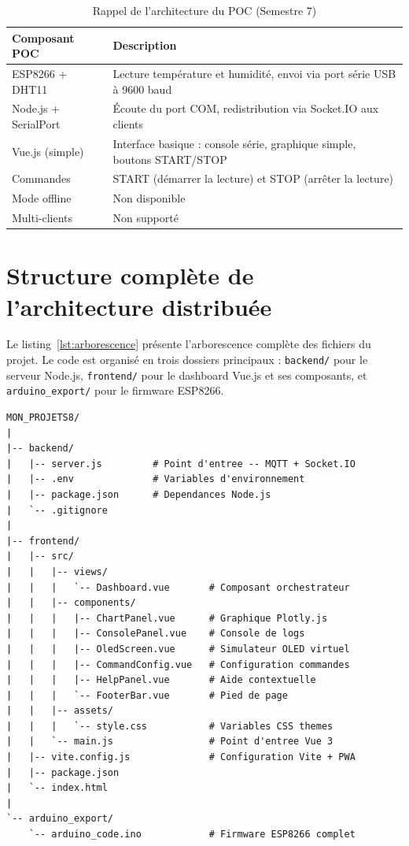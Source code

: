 \documentclass[12pt, a4paper]{report}
\begin{document}
\begin{table}[H]
\centering
\renewcommand{\arraystretch}{1.4}
\begin{tabularx}{\linewidth}{|l|X|}
\hline
\rowcolor{bleuFonce!10}
\textbf{Composant POC} & \textbf{Description} \\
\hline
ESP8266 + DHT11 &
  Lecture temp\'erature et humidit\'e, envoi via port s\'erie USB
  \`a 9600 baud \\
\hline
Node.js + SerialPort &
  \'Ecoute du port COM, redistribution via Socket.IO aux clients \\
\hline
Vue.js (simple) &
  Interface basique : console s\'erie, graphique simple, boutons
  START/STOP \\
\hline
Commandes &
  START (d\'emarrer la lecture) et STOP (arr\^eter la lecture) \\
\hline
Mode offline & Non disponible \\
\hline
Multi-clients & Non support\'e \\
\hline
\end{tabularx}
\caption{Rappel de l'architecture du POC (Semestre 7)}
\label{tab:poc}
\end{table}

\chapter{Structure compl\`ete de l'architecture distribu\'ee}

Le listing~\ref{lst:arborescence} pr\'esente l'arborescence compl\`ete
des fichiers du projet. Le code est organis\'e en trois dossiers
principaux : \texttt{backend/} pour le serveur Node.js,
\texttt{frontend/} pour le dashboard Vue.js et ses composants, et
\texttt{arduino\_export/} pour le firmware ESP8266.

\begin{lstlisting}[caption={Arborescence des fichiers du projet final},
                  label={lst:arborescence}]
MON_PROJETS8/
|
|-- backend/
|   |-- server.js         # Point d'entree -- MQTT + Socket.IO
|   |-- .env              # Variables d'environnement
|   |-- package.json      # Dependances Node.js
|   `-- .gitignore
|
|-- frontend/
|   |-- src/
|   |   |-- views/
|   |   |   `-- Dashboard.vue       # Composant orchestrateur
|   |   |-- components/
|   |   |   |-- ChartPanel.vue      # Graphique Plotly.js
|   |   |   |-- ConsolePanel.vue    # Console de logs
|   |   |   |-- OledScreen.vue      # Simulateur OLED virtuel
|   |   |   |-- CommandConfig.vue   # Configuration commandes
|   |   |   |-- HelpPanel.vue       # Aide contextuelle
|   |   |   `-- FooterBar.vue       # Pied de page
|   |   |-- assets/
|   |   |   `-- style.css           # Variables CSS themes
|   |   `-- main.js                 # Point d'entree Vue 3
|   |-- vite.config.js              # Configuration Vite + PWA
|   |-- package.json
|   `-- index.html
|
`-- arduino_export/
    `-- arduino_code.ino            # Firmware ESP8266 complet
\end{lstlisting}
\end{document}

